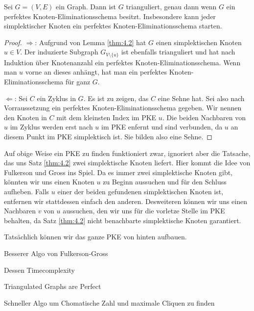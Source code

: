 \documentclass[../main.tex]{subfiles}
\begin{document}
\begin{satz}
    Sei $G = (V, E)$ ein Graph. Dann ist $G$ trianguliert, genau dann wenn $G$ ein perfektes Knoten-Eliminationsschema besitzt. Insbesondere kann jeder simplektischer Knoten ein perfektes Knoten-Eliminationsschema starten.
\end{satz}
\begin{proof}
    $\Rightarrow$: Aufgrund von Lemma \ref{thm:4.2} hat $G$ einen simplektischen Knoten $u \in V$. Der induzierte Subgraph $G_{V \setminus \{u\}}$ ist ebenfalls trianguliert und hat nach Induktion über Knotenanzahl ein perfektes Knoten-Eliminationsschema. Wenn man $u$ vorne an dieses anhängt, hat man ein perfektes Knoten-Eliminationsschema für ganz $G$.
    
    $\Leftarrow$: Sei $C$ ein Zyklus in $G$. Es ist zu zeigen, das $C$ eine Sehne hat. Sei also nach Vorraussetzung ein perfektes Knoten-Eliminationsschema gegeben. Wir nennen den Knoten in $C$ mit dem kleinsten Index im PKE $u$. Die beiden Nachbaren von $u$ im Zyklus werden erst nach $u$ im PKE enfernt und sind verbunden, da $u$ an diesem Punkt im PKE simplektisch ist. Sie bilden also eine Sehne.
\end{proof}    
    
Auf obige Weise ein PKE zu finden funktioniert zwar, ignoriert aber die Tatsache, das uns Satz \ref{thm:4.2} zwei simplektische Knoten liefert. Hier kommt die Idee von Fulkerson und Gross ins Spiel. Da es immer zwei simplektische Knoten gibt, könnten wir uns einen Knoten $u$ zu Beginn aussuchen und für den Schluss aufheben. Falls $u$ einer der beiden gefundenen simplektischen Knoten ist, entfernen wir stattdessen einfach den anderen. Desweiteren können wir uns einen Nachbaren $v$ von $u$ aussuchen, den wir uns für die vorletze Stelle im PKE behalten, da Satz \ref{thm:4.2} nicht benachbarte simplektische Knoten garantiert.

Tatsächlich können wir das ganze PKE von hinten aufbauen.





Besserer Algo von Fulkerson-Gross

Dessen Timecomplexity

Triangulated Graphs are Perfect

Schneller Algo um Chomatische Zahl und maximale Cliquen zu finden
\end{document}
